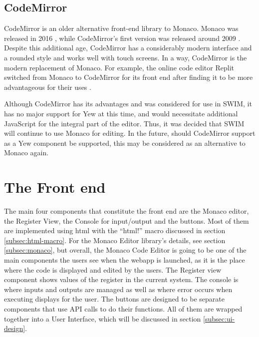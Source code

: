 \documentclass[parskip=half, fontsize=12pt]{scrartcl}
\let\oldsection\section
\renewcommand\section{\newpage\oldsection}
\begin{document}
\subsection{CodeMirror}

CodeMirror is an older alternative front-end library to Monaco. Monaco
was released in 2016 \cite{monaco-changelog}, while CodeMirror's first version was released
around 2009 \cite{codemirror-changelog}. Despite this additional age,
CodeMirror has a considerably modern interface and a rounded style and
works well with touch screens. In a way, CodeMirror is the modern
replacement of Monaco. For example, the online code editor Replit
switched from Monaco to CodeMirror for its front end after finding it to
be more advantageous for their uses \cite{replit-code-editors}.

Although CodeMirror has its advantages and was considered for use in
SWIM, it has no major support for Yew at this time, and would
necessitate additional JavaScript for the integral part of the editor.
Thus, it was decided that SWIM will continue to use Monaco for editing.
In the future, should CodeMirror support as a Yew component be
supported, this may be considered as an alternative to Monaco again.


\section{The Front end}

The main four components that constitute the front end are the Monaco
editor, the Register View, the Console for input/output and the buttons.
Most of them are implemented using html with the ``html!'' macro
discussed in section \ref{subsec:html-macro}. For the Monaco Editor library's details,
see section \ref{subsec:monaco}, but overall, the Monaco Code Editor is going to be one
of the main components the users see when the webapp is launched, as it
is the place where the code is displayed and edited by the users. The
Register view component shows values of the register in the current
system. The console is where inputs and outputs are managed as well as
where error occurs when executing displays for the user. The buttons are
designed to be separate components that use API calls to do their
functions. All of them are wrapped together into a User Interface, which
will be discussed in section \ref{subsec:ui-design}.
\end{document}
